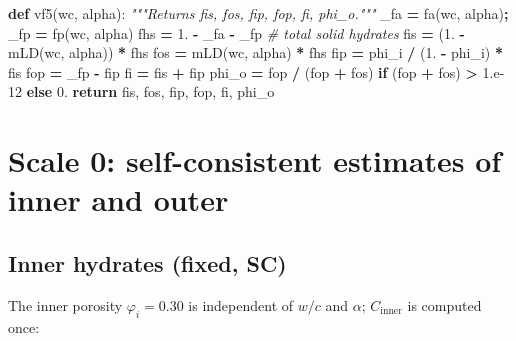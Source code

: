 \documentclass[
  a4paper,
  numbers=noendperiod,
  DIV=12]{scrreprt}
\newenvironment{Shaded}{\begin{snugshade}}{\end{snugshade}}
\newcommand{\CommentTok}[1]{\textcolor[rgb]{0.56,0.35,0.01}{\textit{#1}}}
\newcommand{\ControlFlowTok}[1]{\textcolor[rgb]{0.13,0.29,0.53}{\textbf{#1}}}
\newcommand{\FloatTok}[1]{\textcolor[rgb]{0.00,0.00,0.81}{#1}}
\newcommand{\KeywordTok}[1]{\textcolor[rgb]{0.13,0.29,0.53}{\textbf{#1}}}
\newcommand{\NormalTok}[1]{#1}
\newcommand{\OperatorTok}[1]{\textcolor[rgb]{0.81,0.36,0.00}{\textbf{#1}}}
\begin{document}
\begin{Shaded}
\begin{Highlighting}[]
\KeywordTok{def}\NormalTok{ vf5(wc, alpha):}
    \CommentTok{"""Returns fis, fos, fip, fop, fi, phi\_o."""}
\NormalTok{    \_fa }\OperatorTok{=}\NormalTok{ fa(wc, alpha)}\OperatorTok{;}\NormalTok{ \_fp }\OperatorTok{=}\NormalTok{ fp(wc, alpha)}
\NormalTok{    fhs }\OperatorTok{=} \FloatTok{1.} \OperatorTok{{-}}\NormalTok{ \_fa }\OperatorTok{{-}}\NormalTok{ \_fp            }\CommentTok{\# total solid hydrates}
\NormalTok{    fis }\OperatorTok{=}\NormalTok{ (}\FloatTok{1.} \OperatorTok{{-}}\NormalTok{ mLD(wc, alpha)) }\OperatorTok{*}\NormalTok{ fhs}
\NormalTok{    fos }\OperatorTok{=}\NormalTok{ mLD(wc, alpha)            }\OperatorTok{*}\NormalTok{ fhs}
\NormalTok{    fip }\OperatorTok{=}\NormalTok{ phi\_i }\OperatorTok{/}\NormalTok{ (}\FloatTok{1.} \OperatorTok{{-}}\NormalTok{ phi\_i) }\OperatorTok{*}\NormalTok{ fis}
\NormalTok{    fop }\OperatorTok{=}\NormalTok{ \_fp }\OperatorTok{{-}}\NormalTok{ fip}
\NormalTok{    fi  }\OperatorTok{=}\NormalTok{ fis }\OperatorTok{+}\NormalTok{ fip}
\NormalTok{    phi\_o }\OperatorTok{=}\NormalTok{ fop }\OperatorTok{/}\NormalTok{ (fop }\OperatorTok{+}\NormalTok{ fos) }\ControlFlowTok{if}\NormalTok{ (fop }\OperatorTok{+}\NormalTok{ fos) }\OperatorTok{\textgreater{}} \FloatTok{1.e{-}12} \ControlFlowTok{else} \FloatTok{0.}
    \ControlFlowTok{return}\NormalTok{ fis, fos, fip, fop, fi, phi\_o}
\end{Highlighting}
\end{Shaded}

\section{Scale 0: self-consistent estimates of inner and
outer}\label{sec-sc-inner-outer}

\subsection{Inner hydrates (fixed, SC)}\label{inner-hydrates-fixed-sc}

The inner porosity \(\varphi_i=0.30\) is independent of \(w/c\) and
\(\alpha\); \(C_\text{inner}\) is computed once:
\end{document}
